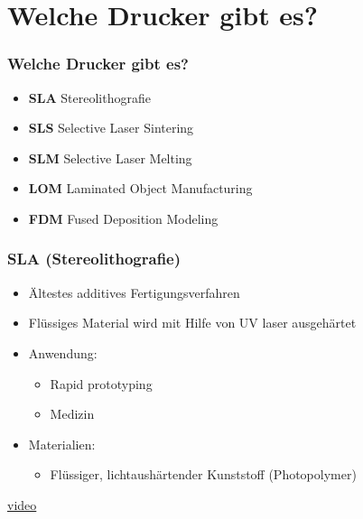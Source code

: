\section{Welche Drucker gibt es?}
\begin{frame}
  \frametitle{Welche Drucker gibt es?}
  \pause
  \begin{itemize}
    \item \textbf{SLA} Stereolithografie \pause
    \item \textbf{SLS} Selective Laser Sintering \pause
    \item \textbf{SLM} Selective Laser Melting \pause
    \item \textbf{LOM} Laminated Object Manufacturing \pause
    \item \textbf{FDM} Fused Deposition Modeling
  \end{itemize}
\end{frame}

\begin{frame}
  \frametitle{SLA (Stereolithografie)}
  \pause
  \begin{itemize}
    \item Ältestes additives Fertigungsverfahren \pause
    \item Flüssiges Material wird mit Hilfe von UV laser ausgehärtet \pause
    \item Anwendung:
    \begin{itemize}
      \item Rapid prototyping
      \item Medizin \pause
    \end{itemize}
    \item Materialien:
    \begin{itemize}
      \item Flüssiger, lichtaushärtender Kunststoff (Photopolymer) \pause
    \end{itemize}
  \end{itemize}
  \href{https://youtu.be/8a2xNaAkvLo}{video}
\end{frame}

